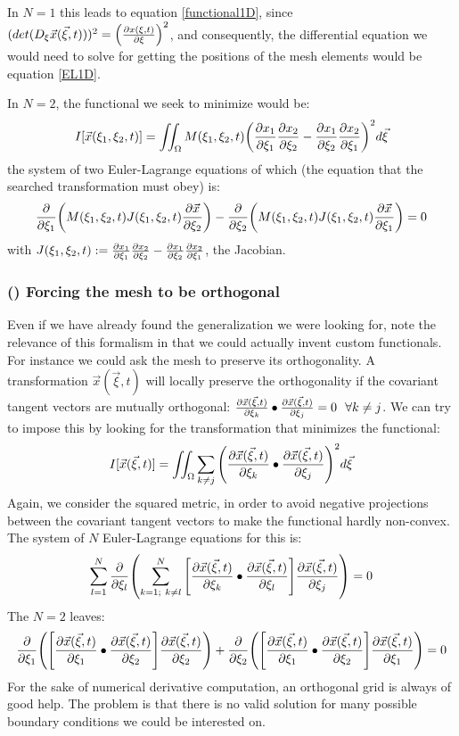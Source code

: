 \documentclass[11pt, a4paper]{article} %
\begin{document}
In $N=1$ this leads to equation \eqref{functional1D}, since $(det(D_\xi \vec{x}(\vec{\xi},t)))^2=\qty(\pdv{x(\xi,t)}{\xi})^2$, and consequently, the differential equation we would need to solve for getting the positions of the mesh elements would be equation \eqref{EL1D}.

In $N=2$, the functional we seek to minimize would be:
\begin{equation}
I[\vec{x}(\xi_1,\xi_2 ,t)]=\iint_\Omega M(\xi_1, \xi_2,t) \qty( \pdv{x_1}{\xi_1}\pdv{x_2}{\xi_2} - \pdv{x_1}{\xi_2} \pdv{x_2}{\xi_1})^2 d\vec{\xi}
\end{equation}
the system of two Euler-Lagrange equations of which (the equation that the searched transformation must obey) is:
\begin{equation}
\pdv{}{\xi_1}\qty(M(\xi_1,\xi_2,t)J(\xi_1,\xi_2,t)\pdv{\vec{x}}{\xi_2})-\pdv{}{\xi_2}\qty(M(\xi_1,\xi_2,t)J(\xi_1,\xi_2,t)\pdv{\vec{x}}{\xi_1})=0
\end{equation}
with $J(\xi_1,\xi_2,t):=\pdv{x_1}{\xi_1}\pdv{x_2}{\xi_2} - \pdv{x_1}{\xi_2} \pdv{x_2}{\xi_1}$, the Jacobian.

\subsubsection*{\bf (\textgamma) Forcing the mesh to be orthogonal}
Even if we have already found the generalization we were looking for, note the relevance of this formalism in that we could actually invent custom functionals. For instance we could ask the mesh to preserve its orthogonality. A transformation $\vec{x}(\vec{\xi},t)$ will locally preserve the orthogonality if the covariant tangent vectors are mutually orthogonal: $\pdv{\vec{x}(\vec{\xi},t)}{\xi_k}\bullet \pdv{\vec{x}(\vec{\xi},t)}{\xi_j}=0\ \ \forall k\neq j$. We can try to impose this by looking for the transformation that minimizes the functional:
\begin{equation}
I[\vec{x}(\vec{\xi},t)]=\iint_\Omega \sum_{k\neq j} \qty(\pdv{\vec{x}(\vec{\xi},t)}{\xi_k}\bullet \pdv{\vec{x}(\vec{\xi},t)}{\xi_j})^2 d\vec{\xi}
\end{equation}
Again, we consider the squared metric, in order to avoid negative projections between the covariant tangent vectors to make the functional hardly non-convex.
The system of $N$ Euler-Lagrange equations for this is:
\begin{equation}
\sum_{l=1}^N \pdv{}{\xi_l}\qty( \sum_{k=1;\ k\neq l}^N \qty[\pdv{\vec{x}(\vec{\xi},t)}{\xi_k}\bullet \pdv{\vec{x}(\vec{\xi},t)}{\xi_l}] \pdv{\vec{x}(\vec{\xi},t)}{\xi_j}  )=0
\end{equation}
The $N=2$ leaves:
\begin{equation}
\pdv{}{\xi_1}\qty( \qty[\pdv{\vec{x}(\vec{\xi},t)}{\xi_1}\bullet \pdv{\vec{x}(\vec{\xi},t)}{\xi_2}] \pdv{\vec{x}(\vec{\xi},t)}{\xi_2}  )+\pdv{}{\xi_2}\qty( \qty[\pdv{\vec{x}(\vec{\xi},t)}{\xi_1}\bullet \pdv{\vec{x}(\vec{\xi},t)}{\xi_2}] \pdv{\vec{x}(\vec{\xi},t)}{\xi_1}  )=0
\end{equation}
For the sake of numerical derivative computation, an orthogonal grid is always of good help. The problem is that there is no valid solution for many possible boundary conditions we could be interested on.
\end{document}

